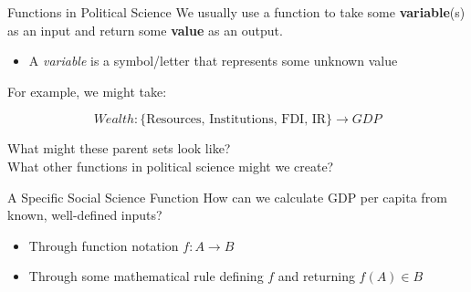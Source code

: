 \documentclass[10pt]{beamer}
\begin{document}
\begin{frame}{Functions in Political Science}
    We usually use a function to take some \textbf{variable}(s) as an input and return some \textbf{value} as an output. \\
\vspace{.5cm}
    \begin{itemize}
        \item A \textit{variable} is a symbol/letter that represents some unknown value
    \end{itemize}

    \vspace{.5cm}

    For example, we might take:

    \[Wealth: \{\text{Resources, Institutions, FDI, IR}\} \rightarrow GDP\]

    What might these parent sets look like? \\
    \pause
    \vspace{.5cm}
    What other functions in political science might we create?
\end{frame}

\begin{frame}{A Specific Social Science Function}
    How can we calculate GDP per capita from known, well-defined inputs? \\
    \vspace{.5cm}

    \begin{itemize}
        \item Through function notation $f: A \rightarrow B$
        \item Through some mathematical rule defining $f$ and returning $f(A) \in B$
    \end{itemize}
\end{frame}
\end{document}
